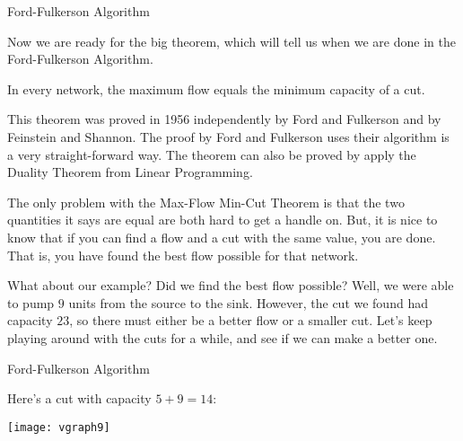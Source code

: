 \begin{frame}[fragile]{Ford-Fulkerson Algorithm}

Now we are ready for the big theorem, which will tell us when we are done in the Ford-Fulkerson Algorithm.

\begin{theorem}
In every network, the maximum flow equals the minimum capacity of a cut.
\end{theorem}

This theorem was proved in 1956 independently by Ford and Fulkerson and by Feinstein and Shannon.  The proof by Ford and Fulkerson uses their algorithm is a very straight-forward way.  The theorem can also be proved by apply the Duality Theorem from Linear Programming.

The only problem with the Max-Flow Min-Cut Theorem is that the two quantities it says are equal are both hard to get a handle on.  But, it is nice to know that if you can find a flow and a cut with the same value, you are done.  That is, you have found the best flow possible for that network.

What about our example?  Did we find the best flow possible?  Well, we were able to pump $9$ units from the source to the sink.  However, the cut we found had capacity $23$, so there must either be a better flow or a smaller cut.  Let's keep playing around with the cuts for a while, and see if we can make a better one.

\end{frame}
\begin{frame}[fragile]{Ford-Fulkerson Algorithm}

Here's a cut with capacity $5+9=14$:

\begin{center}
\texttt{[image: vgraph9]}
\end{center}



\end{frame}
